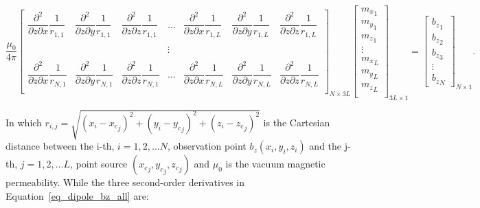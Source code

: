 \begin{equation}
\label{eq_dipole_bz_all}
\dfrac{\mu_0}{4\pi}
{\begin{bmatrix}
\dfrac{\partial^2}{\partial z \partial x} \dfrac{1}{r_{1,1}}
& \dfrac{\partial^2}{\partial z \partial y} \dfrac{1}{r_{1,1}}
& \dfrac{\partial^2}{\partial z \partial z} \dfrac{1}{r_{1,1}}
& \hdots
& \dfrac{\partial^2}{\partial z \partial x} \dfrac{1}{r_{1,L}}
& \dfrac{\partial^2}{\partial z \partial y} \dfrac{1}{r_{1,L}}
& \dfrac{\partial^2}{\partial z \partial z} \dfrac{1}{r_{1,L}} \\
\\

& 
& 
& \vdots
& 
& 
&  \\
\\
\dfrac{\partial^2}{\partial z \partial x} \dfrac{1}{r_{N,1}}
& \dfrac{\partial^2}{\partial z \partial y} \dfrac{1}{r_{N,1}}
& \dfrac{\partial^2}{\partial z \partial z} \dfrac{1}{r_{N,1}}
& \hdots
& \dfrac{\partial^2}{\partial z \partial x} \dfrac{1}{r_{N,L}}
& \dfrac{\partial^2}{\partial z \partial y} \dfrac{1}{r_{N,L}}
& \dfrac{\partial^2}{\partial z \partial z} \dfrac{1}{r_{N,L}} \\
\end{bmatrix}}_{N \times 3L}
{\begin{bmatrix}
{m_x}_1 \\ {m_y}_1 \\ {m_z}_1 \\ \vdots \\{m_x}_L \\ {m_y}_L \\ {m_z}_L \\
\end{bmatrix}}_{3L \times 1}
=
{\begin{bmatrix}
{b_z}_1 \\ {b_z}_2 \\ {b_z}_3 \\ \vdots \\{b_z}_N 
\end{bmatrix}}_{N \times 1}.
\end{equation} \bigskip

In which $r_{i,j} = \sqrt{(x_i - {x_c}_j)^2 + (y_i - {y_c}_j)^2 + (z_i - {z_c}_j)^2}$ is the Cartesian distance between the i-th, $i=1, 2, \hdots N$, observation point $b_z (x_i, y_i, z_i)$ and the j-th, $j=1, 2, \hdots L$, point source $({x_c}_j, {y_c}_j, {z_c}_j)$ and $\mu_0$ is the vacuum magnetic permeability. While the three second-order derivatives in Equation~\ref{eq_dipole_bz_all} are:

